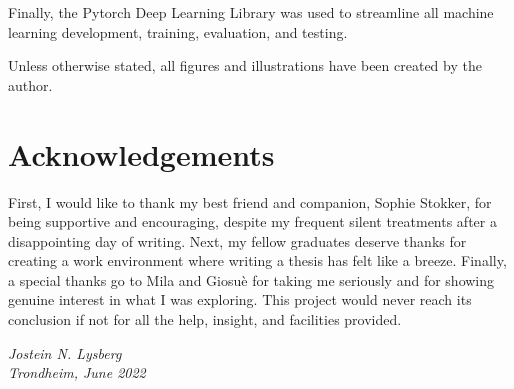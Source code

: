 Finally, the Pytorch Deep Learning Library \cite{paszke2019} was used to streamline all machine learning development, training, evaluation, and testing.


Unless otherwise stated, all figures and illustrations have been created by the author.

\section*{Acknowledgements}

First, I would like to thank my best friend and companion, Sophie Stokker, for being supportive and encouraging, despite my frequent silent treatments after a disappointing day of writing. Next, my fellow graduates deserve thanks for creating a work environment where writing a thesis has felt like a breeze. Finally, a special thanks go to Mila and Giosuè for taking me seriously and for showing genuine interest in what I was exploring. This project would never reach its conclusion if not for all the help, insight, and facilities provided. 




\hfill {\it Jostein N. Lysberg}\\[-6mm]

\hfill {\it Trondheim, June 2022}